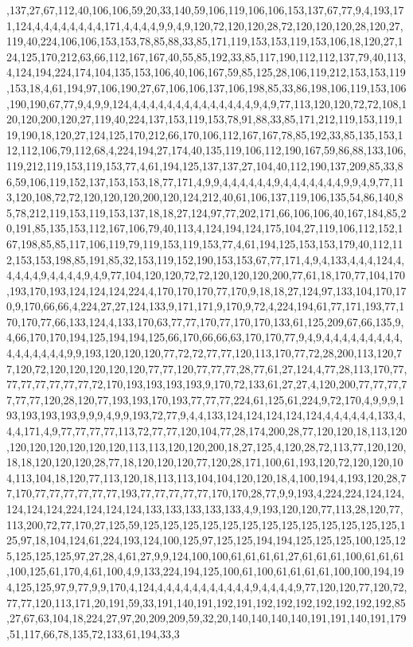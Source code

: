 ,137,27,67,112,40,106,106,59,20,33,140,59,106,119,106,106,153,137,67,77,9,4,193,171,124,4,4,4,4,4,4,4,4,171,4,4,4,4,9,9,4,9,120,72,120,120,28,72,120,120,120,28,120,27,119,40,224,106,106,153,153,78,85,88,33,85,171,119,153,153,119,153,106,18,120,27,124,125,170,212,63,66,112,167,167,40,55,85,192,33,85,117,190,112,112,137,79,40,113,4,124,194,224,174,104,135,153,106,40,106,167,59,85,125,28,106,119,212,153,153,119,153,18,4,61,194,97,106,190,27,67,106,106,137,106,198,85,33,86,198,106,119,153,106,190,190,67,77,9,4,9,9,124,4,4,4,4,4,4,4,4,4,4,4,4,4,4,9,4,9,77,113,120,120,72,72,108,120,120,200,120,27,119,40,224,137,153,119,153,78,91,88,33,85,171,212,119,153,119,119,190,18,120,27,124,125,170,212,66,170,106,112,167,167,78,85,192,33,85,135,153,112,112,106,79,112,68,4,224,194,27,174,40,135,119,106,112,190,167,59,86,88,133,106,119,212,119,153,119,153,77,4,61,194,125,137,137,27,104,40,112,190,137,209,85,33,86,59,106,119,152,137,153,153,18,77,171,4,9,9,4,4,4,4,4,4,9,4,4,4,4,4,4,4,9,9,4,9,77,113,120,108,72,72,120,120,120,200,120,124,212,40,61,106,137,119,106,135,54,86,140,85,78,212,119,153,119,153,137,18,18,27,124,97,77,202,171,66,106,106,40,167,184,85,20,191,85,135,153,112,167,106,79,40,113,4,124,194,124,175,104,27,119,106,112,152,167,198,85,85,117,106,119,79,119,153,119,153,77,4,61,194,125,153,153,179,40,112,112,153,153,198,85,191,85,32,153,119,152,190,153,153,67,77,171,4,9,4,133,4,4,4,124,4,4,4,4,4,9,4,4,4,4,9,4,9,77,104,120,120,72,72,120,120,120,200,77,61,18,170,77,104,170,193,170,193,124,124,124,224,4,170,170,170,77,170,9,18,18,27,124,97,133,104,170,170,9,170,66,66,4,224,27,27,124,133,9,171,171,9,170,9,72,4,224,194,61,77,171,193,77,170,170,77,66,133,124,4,133,170,63,77,77,170,77,170,170,133,61,125,209,67,66,135,9,4,66,170,170,194,125,194,194,125,66,170,66,66,63,170,170,77,9,4,9,4,4,4,4,4,4,4,4,4,4,4,4,4,4,4,4,9,9,193,120,120,120,77,72,72,77,77,120,113,170,77,72,28,200,113,120,77,120,72,120,120,120,120,120,77,77,120,77,77,77,28,77,61,27,124,4,77,28,113,170,77,77,77,77,77,77,77,72,170,193,193,193,193,9,170,72,133,61,27,27,4,120,200,77,77,77,77,77,77,120,28,120,77,193,193,170,193,77,77,77,224,61,125,61,224,9,72,170,4,9,9,9,193,193,193,193,9,9,9,4,9,9,193,72,77,9,4,4,133,124,124,124,124,124,4,4,4,4,4,4,133,4,4,4,171,4,9,77,77,77,77,113,72,77,77,120,104,77,28,174,200,28,77,120,120,18,113,120,120,120,120,120,120,120,113,113,120,120,200,18,27,125,4,120,28,72,113,77,120,120,18,18,120,120,120,28,77,18,120,120,120,77,120,28,171,100,61,193,120,72,120,120,104,113,104,18,120,77,113,120,18,113,113,104,104,120,120,18,4,100,194,4,193,120,28,77,170,77,77,77,77,77,77,193,77,77,77,77,77,170,170,28,77,9,9,193,4,224,224,124,124,124,124,124,224,124,124,124,133,133,133,133,133,4,9,193,120,120,77,113,28,120,77,113,200,72,77,170,27,125,59,125,125,125,125,125,125,125,125,125,125,125,125,125,125,97,18,104,124,61,224,193,124,100,125,97,125,125,194,194,125,125,125,100,125,125,125,125,125,97,27,28,4,61,27,9,9,124,100,100,61,61,61,61,27,61,61,61,100,61,61,61,100,125,61,170,4,61,100,4,9,133,224,194,125,100,61,100,61,61,61,61,100,100,194,194,125,125,97,9,77,9,9,170,4,124,4,4,4,4,4,4,4,4,4,4,4,9,4,4,4,4,9,77,120,120,77,120,72,77,77,120,113,171,20,191,59,33,191,140,191,192,191,192,192,192,192,192,192,192,85,27,67,63,104,18,224,27,97,20,209,209,59,32,20,140,140,140,140,191,191,140,191,179,51,117,66,78,135,72,133,61,194,33,3